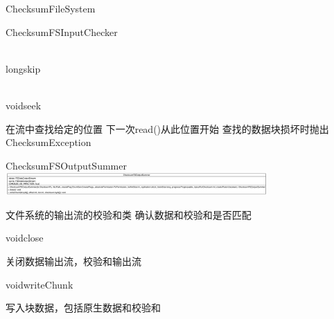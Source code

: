 \begin{XeClass}{ChecksumFileSystem}
\begin{XeInnerClass}{ChecksumFSInputChecker}
\begin{XeMethod}{\XePublic \\ \XeSync}{long}{skip}
        \end{XeMethod}

        \begin{XeMethod}{\XePublic \\ \XeSync}{void}{seek}
             
 在流中查找给定的位置
 下一次read()从此位置开始
 查找的数据块损坏时抛出ChecksumException 

        \end{XeMethod}

    \end{XeInnerClass}
    \begin{XeInnerClass}{ChecksumFSOutputSummer}
\includegraphics[width=10cm]{cdig/ChecksumFSOutputSummer.png}
         
 文件系统的输出流的校验和类
 确认数据和校验和是否匹配

        \begin{XeMethod}{\XePublic}{void}{close}
             
 关闭数据输出流，校验和输出流

        \end{XeMethod}

        \begin{XeMethod}{\XeProtected}{void}{writeChunk}
             
 写入块数据，包括原生数据和校验和

        \end{XeMethod}

    \end{XeInnerClass}
\end{XeClass}
